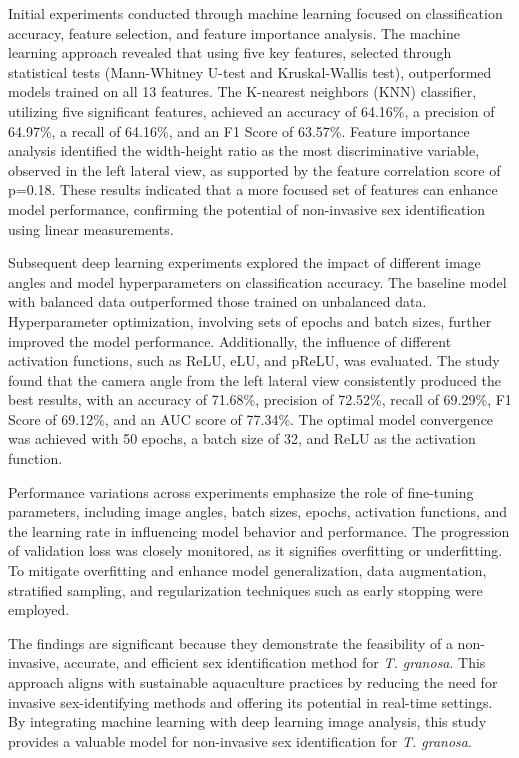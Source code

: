 Initial experiments conducted through machine learning focused on classification accuracy, feature selection, and feature importance analysis. The machine learning approach revealed that using five key features, selected through statistical tests (Mann-Whitney U-test and Kruskal-Wallis test), outperformed models trained on all 13 features. The K-nearest neighbors (KNN) classifier, utilizing five significant features, achieved an accuracy of 64.16\%, a precision of 64.97\%, a recall of 64.16\%, and an F1 Score of 63.57\%. Feature importance analysis identified the width-height ratio as the most discriminative variable, observed in the left lateral view, as supported by the feature correlation score of p=0.18. These results indicated that a more focused set of features can enhance model performance, confirming the potential of non-invasive sex identification using linear measurements. 

Subsequent deep learning experiments explored the impact of different image angles and model hyperparameters on classification accuracy. The baseline model with balanced data outperformed those trained on unbalanced data. Hyperparameter optimization,  involving sets of epochs and batch sizes, further improved the model performance. Additionally, the influence of different activation functions, such as ReLU, eLU, and pReLU, was evaluated. The study found that the camera angle from the left lateral view consistently produced the best results, with an accuracy of 71.68\%, precision of 72.52\%, recall of 69.29\%, F1 Score of 69.12\%, and an AUC score of 77.34\%. The optimal model convergence was achieved with 50 epochs, a batch size of 32, and ReLU as the activation function. 

Performance variations across experiments emphasize the role of fine-tuning parameters, including image angles, batch sizes, epochs, activation functions, and the learning rate in influencing model behavior and performance. The progression of validation loss was closely monitored, as it signifies overfitting or underfitting. To mitigate overfitting and enhance model generalization, data augmentation, stratified sampling, and regularization techniques such as early stopping were employed.

The findings are significant because they demonstrate the feasibility of a non-invasive, accurate, and efficient sex identification method for \textit{T. granosa}. This approach aligns with sustainable aquaculture practices by reducing the need for invasive sex-identifying methods and offering its potential in real-time settings. By integrating machine learning with deep learning image analysis, this study provides a valuable model for non-invasive sex identification for \textit{T. granosa}.

